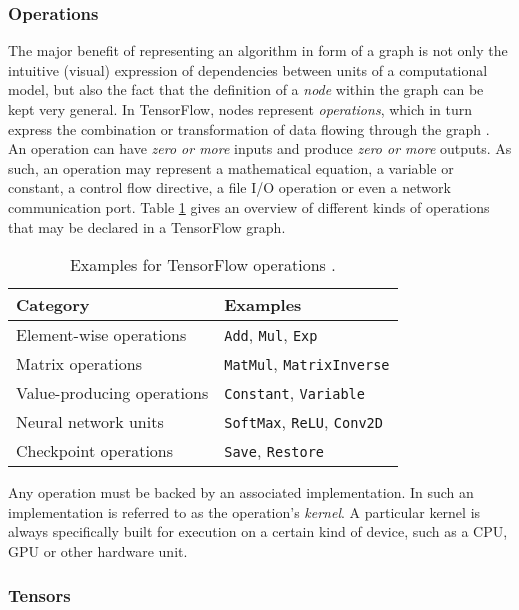\subsubsection{Operations}\label{sec:model-graphs-ops}

The major benefit of representing an algorithm in form of a graph is not only
the intuitive (visual) expression of dependencies between units of a
computational model, but also the fact that the definition of a \emph{node}
within the graph can be kept very general. In TensorFlow, nodes represent
\emph{operations}, which in turn express the combination or transformation of
data flowing through the graph \cite{tensorflow}. An operation can have
\emph{zero or more} inputs and produce \emph{zero or more} outputs. As such, an
operation may represent a mathematical equation, a variable or constant, a
control flow directive, a file I/O operation or even a network communication
port. Table \ref{tab:ops} gives an overview of different kinds of operations
that may be declared in a TensorFlow graph.

\begin{table}[b!]
  \begin{tabular}{ll}
    \textbf{Category} & \textbf{Examples}
    \\ \toprule
    Element-wise operations & \texttt{Add}, \texttt{Mul}, \texttt{Exp}
    \\
    Matrix operations & \texttt{MatMul}, \texttt{MatrixInverse}
    \\
    Value-producing operations & \texttt{Constant}, \texttt{Variable}
    \\
    Neural network units & \texttt{SoftMax}, \texttt{ReLU}, \texttt{Conv2D}
    \\
    Checkpoint operations & \texttt{Save}, \texttt{Restore}
    \\ \bottomrule
    \end{tabular}
    \label{tab:ops}
    \caption{Examples for TensorFlow operations \cite{tensorflow}.}
\end{table}

Any operation must be backed by an associated implementation. In
\cite{tensorflow} such an implementation is referred to as the operation's
\emph{kernel}. A particular kernel is always specifically built for execution on
a certain kind of device, such as a CPU, GPU or other hardware unit.

\subsubsection{Tensors}\label{sec:model-graphs-tensors}


